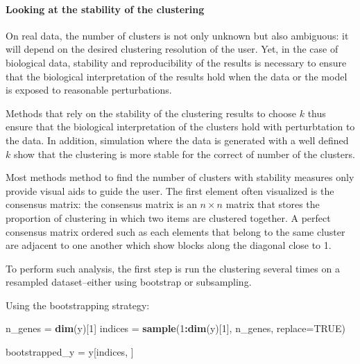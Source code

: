 \documentclass[9pt,a4paper,]{extarticle}
\newenvironment{Shaded}{\begin{snugshade}}{\end{snugshade}}
\newcommand{\DataTypeTok}[1]{\textcolor[rgb]{0.13,0.29,0.53}{#1}}
\newcommand{\DecValTok}[1]{\textcolor[rgb]{0.00,0.00,0.81}{#1}}
\newcommand{\KeywordTok}[1]{\textcolor[rgb]{0.13,0.29,0.53}{\textbf{#1}}}
\newcommand{\NormalTok}[1]{#1}
\newcommand{\OperatorTok}[1]{\textcolor[rgb]{0.81,0.36,0.00}{\textbf{#1}}}
\newcommand{\OtherTok}[1]{\textcolor[rgb]{0.56,0.35,0.01}{#1}}
\newcommand{\StringTok}[1]{\textcolor[rgb]{0.31,0.60,0.02}{#1}}
\begin{document}
\hypertarget{looking-at-the-stability-of-the-clustering}{%
\paragraph{Looking at the stability of the clustering}\label{looking-at-the-stability-of-the-clustering}}

On real data, the number of clusters is not only unknown but also
ambiguous: it will depend on the desired clustering resolution of the user.
Yet, in the case of biological data, stability and reproducibility of the
results is necessary to ensure that the biological interpretation of the
results hold when the data or the model is exposed to reasonable
perturbations.

Methods that rely on the stability of the clustering results to choose \(k\)
thus ensure that the biological interpretation of the clusters hold with
perturbtation to the data. In addition, simulation where the data is generated
with a well defined \(k\) show that the clustering is more stable for the
correct of number of the clusters.

Most methods method to find the number of clusters with stability measures
only provide visual aids to guide the user. The first element often visualized
is the consensus matrix: the consensus matrix is an \(n \times n\) matrix that
stores the proportion of clustering in which two items are clustered together.
A perfect consensus matrix ordered such as each elements that belong to the
same cluster are adjacent to one another which show blocks along the diagonal
close to 1.

To perform such analysis, the first step is run the clustering several times
on a resampled dataset--either using bootstrap or subsampling.

Using the bootstrapping strategy:

\begin{Shaded}
\begin{Highlighting}[]
\NormalTok{n_genes =}\StringTok{ }\KeywordTok{dim}\NormalTok{(y)[}\DecValTok{1}\NormalTok{]}
\NormalTok{indices =}\StringTok{ }\KeywordTok{sample}\NormalTok{(}\DecValTok{1}\OperatorTok{:}\KeywordTok{dim}\NormalTok{(y)[}\DecValTok{1}\NormalTok{], n_genes, }\DataTypeTok{replace=}\OtherTok{TRUE}\NormalTok{)}

\NormalTok{bootstrapped_y =}\StringTok{ }\NormalTok{y[indices, ]}
\end{Highlighting}
\end{Shaded}
\end{document}

